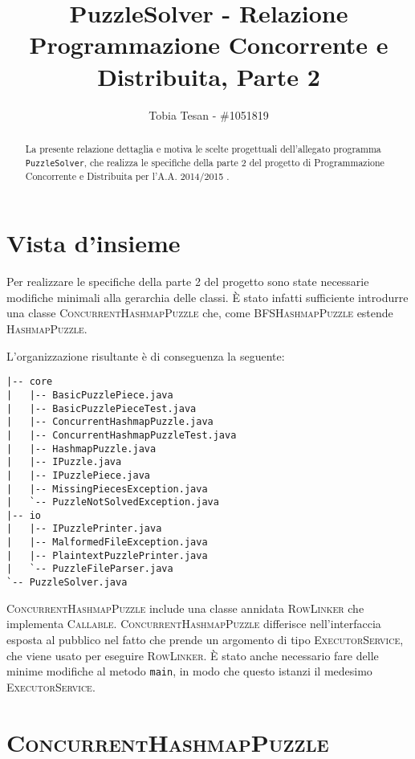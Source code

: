 \documentclass[a4paper]{article}
\title{PuzzleSolver - Relazione Programmazione Concorrente e Distribuita, Parte 2}
\author{Tobia Tesan - \#1051819}
\newcommand{\Classname}[1]{\textsc{#1}}
\newcommand{\Ifacename}[1]{\textsc{#1}}
\newcommand{\Methodname}[1]{\texttt{#1}}
\begin{document}
\maketitle

\begin{abstract}
La presente relazione dettaglia e motiva le scelte progettuali dell'allegato programma \texttt{PuzzleSolver}, che realizza le specifiche della parte 2 del progetto di Programmazione Concorrente e Distribuita per l'A.A. 2014/2015 \cite{prspec}.
\end{abstract}

\tableofcontents

\section{Vista d'insieme}

Per realizzare le specifiche della parte 2 del progetto sono state necessarie modifiche minimali alla gerarchia delle classi.
\`E stato infatti sufficiente introdurre una classe \Classname{ConcurrentHashmapPuzzle} che, come \Classname{BFSHashmapPuzzle} estende \Classname{HashmapPuzzle}.

L'organizzazione risultante \`e di conseguenza la seguente:

\begin{verbatim}
|-- core
|   |-- BasicPuzzlePiece.java
|   |-- BasicPuzzlePieceTest.java
|   |-- ConcurrentHashmapPuzzle.java
|   |-- ConcurrentHashmapPuzzleTest.java
|   |-- HashmapPuzzle.java
|   |-- IPuzzle.java
|   |-- IPuzzlePiece.java
|   |-- MissingPiecesException.java
|   `-- PuzzleNotSolvedException.java
|-- io
|   |-- IPuzzlePrinter.java
|   |-- MalformedFileException.java
|   |-- PlaintextPuzzlePrinter.java
|   `-- PuzzleFileParser.java
`-- PuzzleSolver.java
\end{verbatim}

\Classname{ConcurrentHashmapPuzzle} include una classe annidata \Classname{RowLinker} che implementa \Ifacename{Callable}.
\Classname{ConcurrentHashmapPuzzle} differisce nell'interfaccia esposta al pubblico nel fatto che prende un argomento di tipo \Classname{ExecutorService}, che viene usato per eseguire \Classname{RowLinker}.
\`E stato anche necessario fare delle minime modifiche al metodo \Methodname{main}, in modo che questo istanzi il medesimo \Classname{ExecutorService}.

\section{\Classname{ConcurrentHashmapPuzzle}}
\end{document}
